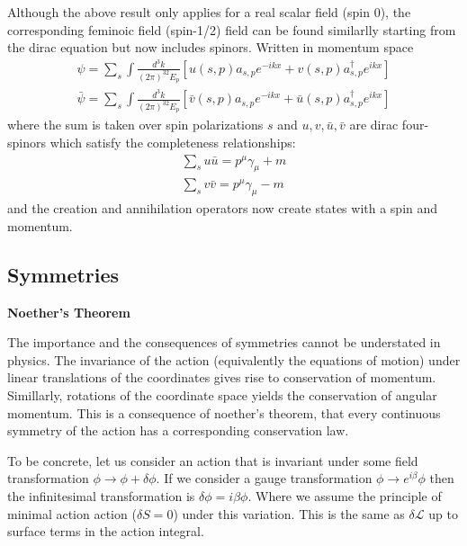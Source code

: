 Although the above result only applies for a real scalar field (spin 0), the corresponding feminoic field (spin-1/2) field can be found similarlly starting from the dirac equation but now includes spinors. Written
in momentum space
\begin{align*}
\psi = \sum_s \int \frac{d^3k}{(2\pi)^32E_p} \left [ u(s,p)  a_{s,p} e^{-ikx} + v(s,p)a_{s,p}^\dagger e^{ikx} \right ]\\
\bar \psi = \sum_s \int \frac{d^3k}{(2\pi)^32E_p} \left[ \bar{v}(s,p) a_{s,p}  e^{-ikx} + \bar{u}(s,p)a_{s,p}^\dagger e^{ikx}\right]
\end{align*}
where the sum is taken over spin polarizations $s$ and $u,v,\bar{u},\bar{v}$ are dirac 
four-spinors which satisfy the completeness relationships:
\begin{align*}
\sum_s u \bar{u} = p^\mu \gamma_\mu + m \\
\sum_s v \bar{v} = p^\mu \gamma_\mu - m
\end{align*}
and the creation and annihilation operators now create states with a spin and momentum.

\subsection{Symmetries}

\textbf{Noether's Theorem}

The importance and the consequences of symmetries cannot be understated in physics. The
invariance of the action (equivalently the equations of motion) under linear translations of the  coordinates
gives rise to conservation of momentum. Simillarly,  rotations of the coordinate space
yields the conservation of angular momentum. This is a consequence of noether's theorem, that every 
continuous symmetry of the action has a corresponding conservation law. 

To be concrete, let us consider an action that is invariant under some field transformation
 $\phi \rightarrow \phi + \delta \phi$. If we consider a gauge transformation $\phi \rightarrow e^{i \beta}\phi$  
then the infinitesimal transformation is $\delta \phi = i \beta \phi$. Where we assume the principle of
minimal action action ($\delta S =0$) under
this variation. This is the same as $\delta \mathcal{L}$ up to surface
 terms in the action integral. 


